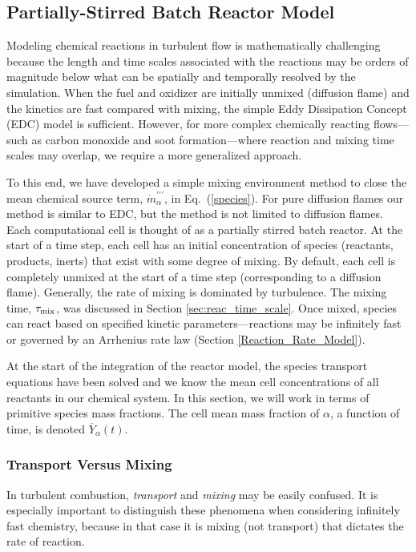 \subsection{Partially-Stirred Batch Reactor Model}
\label{sec:batchreactormodel}

Modeling chemical reactions in turbulent flow is mathematically challenging because the length and time scales associated with the reactions may be orders of magnitude below what can be spatially and temporally resolved by the simulation.  When the fuel and oxidizer are initially unmixed (diffusion flame) and the kinetics are fast compared with mixing, the simple Eddy Dissipation Concept (EDC) model \cite{Magnussen:1,Poinsot:TNC} is sufficient.  However, for more complex chemically reacting flows---such as carbon monoxide and soot formation---where reaction and mixing time scales may overlap, we require a more generalized approach.

To this end, we have developed a simple mixing environment method to close the mean chemical source term, $\dot{m}^{\prime\prime\prime}_{\alpha}$, in Eq.~(\ref{species}).  For pure diffusion flames our method is similar to EDC, but the method is not limited to diffusion flames.  Each computational cell is thought of as a partially stirred batch reactor. At the start of a time step, each cell has an initial concentration of species (reactants, products, inerts) that exist with some degree of mixing. By default, each cell is completely unmixed at the start of a time step (corresponding to a diffusion flame). Generally, the rate of mixing is dominated by turbulence. The mixing time, $\tau_{\rm mix}$, was discussed in Section \ref{sec:reac_time_scale}. Once mixed, species can react based on specified kinetic parameters---reactions may be infinitely fast or governed by an Arrhenius rate law (Section \ref{Reaction_Rate_Model}).

At the start of the integration of the reactor model, the species transport equations have been solved and we know the mean cell concentrations of all reactants in our chemical system.  In this section, we will work in terms of primitive species mass fractions.  The cell mean mass fraction of $\alpha$, a function of time, is denoted $\overline{Y}_\alpha(t)$.

\subsubsection{Transport Versus Mixing}

In turbulent combustion, \emph{transport} and \emph{mixing} may be easily confused.  It is especially important to distinguish these phenomena when considering infinitely fast chemistry, because in that case it is mixing (not transport) that dictates the rate of reaction.

